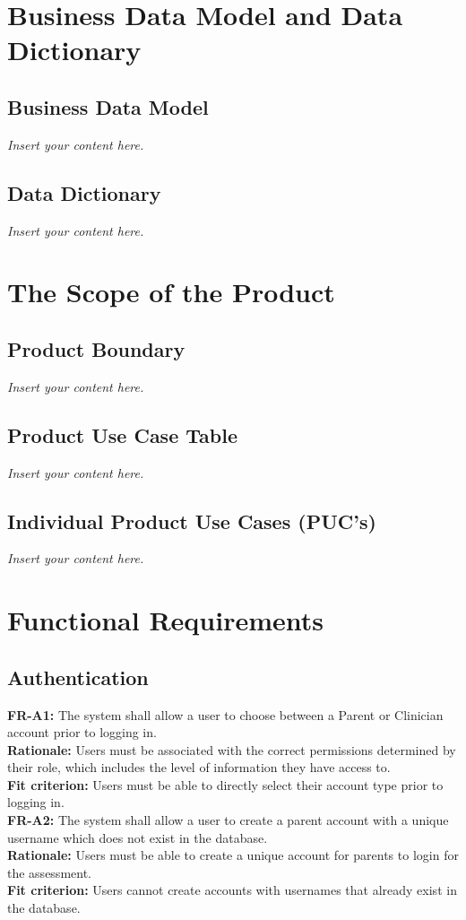 \documentclass[12pt]{article}
\newcommand{\lips}{\textit{Insert your content here.}}
\begin{document}
\section{Business Data Model and Data Dictionary}
\subsection{Business Data Model}
\lips
\subsection{Data Dictionary}
\lips

\section{The Scope of the Product}
\subsection{Product Boundary}
\lips
\subsection{Product Use Case Table}
\lips
\subsection{Individual Product Use Cases (PUC's)}
\lips


\section{Functional Requirements}

\subsection{Authentication}
\textbf{FR-A1: } The system shall allow a user to choose between a Parent or Clinician account prior to logging in.\\
\textbf{Rationale: } Users must be associated with the correct permissions determined by their role, which includes the level of information they have access to.\\
\textbf{Fit criterion: } Users must be able to directly select their account type prior to logging in.\\

\textbf{FR-A2: } The system shall allow a user to create a parent account with a unique username which does not exist in the database.\\
\textbf{Rationale: } Users must be able to create a unique account for parents to login for the assessment.\\
\textbf{Fit criterion: } Users cannot create accounts with usernames that already exist in the database.\\
\end{document}
